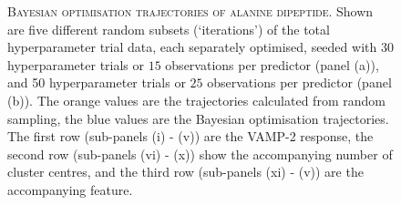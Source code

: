 \begin{figure}[p]
    \centering
    \caption[Bayesian optimisation trajectories of alanine dipeptide]{\textsc{Bayesian optimisation trajectories of alanine dipeptide}. Shown are five different random subsets  (`iterations') of the total hyperparameter trial data, each separately optimised, seeded with $30$ hyperparameter trials or $15$ observations per predictor (panel (a)), and 50 hyperparameter trials or $25$ observations per predictor (panel (b)). The orange values are the trajectories calculated from random sampling, the blue values are the Bayesian optimisation trajectories. The first row (sub-panels (i) - (v)) are the VAMP-2 response, the second row (sub-panels (vi) - (x)) show the accompanying number of cluster centres, and the third row (sub-panels (xi) - (v)) are the  accompanying feature.}\label{fig:ala_opt_traj}
\end{figure}

